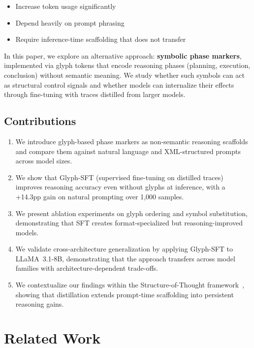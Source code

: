 \documentclass[11pt]{article}
\begin{document}
\begin{itemize}
    \item Increase token usage significantly
    \item Depend heavily on prompt phrasing
    \item Require inference-time scaffolding that does not transfer
\end{itemize}

In this paper, we explore an alternative approach: \textbf{symbolic phase markers}, implemented via glyph tokens that encode reasoning phases (planning, execution, conclusion) without semantic meaning. We study whether such symbols can act as structural control signals and whether models can internalize their effects through fine-tuning with traces distilled from larger models.

\subsection{Contributions}

\begin{enumerate}
    \item We introduce glyph-based phase markers as non-semantic reasoning scaffolds and compare them against natural language and XML-structured prompts across model sizes.
    \item We show that Glyph-SFT (supervised fine-tuning on distilled traces) improves reasoning accuracy even without glyphs at inference, with a +14.3pp gain on natural prompting over 1{,}000 samples.
    \item We present ablation experiments on glyph ordering and symbol substitution, demonstrating that SFT creates format-specialized but reasoning-improved models.
    \item We validate cross-architecture generalization by applying Glyph-SFT to LLaMA~3.1-8B, demonstrating that the approach transfers across model families with architecture-dependent trade-offs.
    \item We contextualize our findings within the Structure-of-Thought framework~\citep{t2sbench2025}, showing that distillation extends prompt-time scaffolding into persistent reasoning gains.
\end{enumerate}

\section{Related Work}
\end{document}
